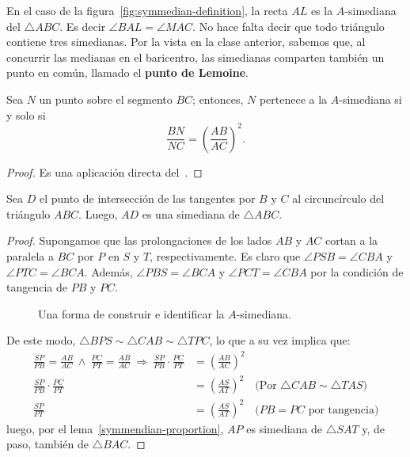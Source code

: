 En el caso de la figura~\ref{fig:symmedian-definition}, la recta $AL$ es la $A$-simediana del $\triangle ABC$.
Es decir $\angle BAL = \angle MAC$.
No hace falta decir que todo triángulo contiene tres simedianas.
Por la  vista en la clase anterior, sabemos que, al concurrir las medianas en el baricentro, las simedianas comparten también un punto en común, llamado el \textbf{punto de Lemoine}.


\begin{section-lemma.tcb}\label{symmendian-proportion}
    Sea $N$ un punto sobre el segmento $BC$; entonces, $N$ pertenece a la $A$\nobreakdash-simediana si y solo si
    \[
        \frac{BN}{NC} = \left(\frac{AB}{AC}\right)^2.
    \]
\end{section-lemma.tcb}

\begin{proof}
    Es una aplicación directa del~.
\end{proof}


\begin{section-lemma.tcb}\label{simedian-lemma}
    Sea $D$ el punto de intersección de las tangentes por $B$ y $C$ al circuncírculo del triángulo $ABC$.
    Luego, $AD$ es una simediana de $\triangle ABC$.
\end{section-lemma.tcb}

\begin{proof}
    Supongamos que las prolongaciones de los lados $AB$ y $AC$ cortan a la paralela a $BC$ por $P$ en $S$ y $T$, respectivamente.
    Es claro que $\angle PSB = \angle CBA$ y $\angle PTC = \angle BCA$.
    Además, $\angle PBS = \angle BCA$ y $\angle PCT = \angle CBA$ por la condición de tangencia de $PB$ y $PC$.

    \begin{figure}[H]
        \centering
        
        \caption{Una forma de construir e identificar la $A$-simediana.}
    \end{figure}

    De este modo, $\triangle BPS \sim \triangle CAB \sim \triangle TPC$, lo que a su vez implica que:
    \begin{align*}
        \frac{SP}{PB} = \frac{AB}{AC} \ \land \ \frac{PC}{PT} = \frac{AB}{AC}
        \ \Rightarrow \ \frac{SP}{PB} \cdot \frac{PC}{PT} &= \left(\frac{AB}{AC}\right)^2\\
        \frac{SP}{PB} \cdot \frac{PC}{PT} &= \left(\frac{AS}{AT}\right)^2 \quad \text{(Por $\triangle CAB \sim \triangle TAS$)}\\
        \frac{SP}{PT}  &= \left(\frac{AS}{AT}\right)^2 \quad \text{($PB = PC$ por tangencia)}
    \end{align*}
    luego, por el lema~\ref{symmendian-proportion}, $AP$ es simediana de $\triangle SAT$ y, de paso, también de $\triangle BAC$.
\end{proof}


